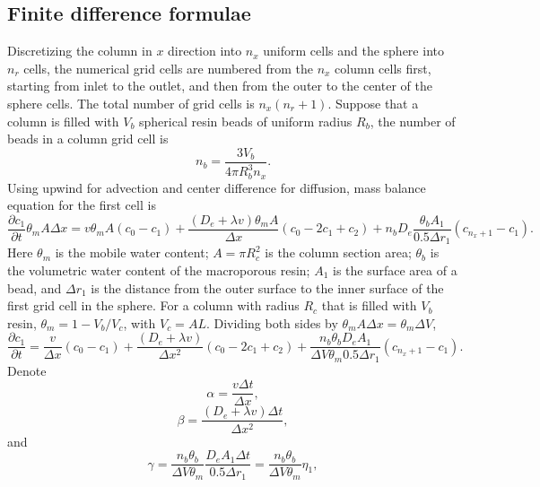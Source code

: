 \documentclass{article}
\begin{document}
\subsection{Finite difference formulae}
Discretizing the column in $x$ direction into $n_x$ uniform cells and the sphere into $n_r$  cells, the numerical grid cells are numbered from the $n_x$ column cells first, starting from inlet to the outlet, and then from the outer to the center of the sphere cells. The total number of grid cells is $n_x(n_r + 1)$. Suppose that a column is filled with $V_b$ spherical resin beads of uniform radius $R_b$, the number of beads in a column grid cell is
\begin{equation}
n_b = \frac{3V_b}{4\pi R_b^3n_x} .
\end{equation}
Using upwind for advection and center difference for diffusion, mass balance equation for the first cell is
\begin{equation}
\frac{\partial c_1}{\partial t}\theta_m A \Delta x = v\theta_m A(c_0 - c_1) + \frac{(D_e+\lambda v )\theta_m A}{\Delta x} \left(c_0 -2 c_1 + c_2\right) + n_b D_e \frac{\theta_bA_1}{0.5\Delta r_1} (c_{n_x+1} - c_1).
\end{equation}
Here $\theta_m$ is the mobile water content; $A=\pi R_c^2$ is the column section area; $\theta_b$  is the volumetric water content of the macroporous resin; $A_1$ is the surface area of a bead, and $\Delta r_1$ is the distance from the outer surface to the inner surface of the first grid cell in the sphere. For a column with radius $R_c$ that is filled with $V_b$ resin, $\theta_m = 1 - V_b/V_c$, with $V_c = AL$. Dividing both sides by $\theta_mA\Delta x = \theta_m \Delta V$, 
\begin{equation}
\frac{\partial c_1}{\partial t}= \frac{v}{\Delta x}(c_0 - c_1) + \frac{(D_e+\lambda v )}{\Delta x^2} \left(c_0 -2 c_1 + c_2\right) + \frac{n_b \theta_b D_e A_1}{\Delta V \theta_m 0.5\Delta r_1} (c_{n_x+1} - c_1).
\end{equation}
Denote 
\begin{equation}
\alpha = \frac{v \Delta t}{\Delta x},
\end{equation}
\begin{equation}
\beta = \frac{(D_e + \lambda v) \Delta t}{\Delta x^2}, 
\end{equation}
and
\begin{equation}
\gamma = \frac{n_b\theta_b}{\Delta V \theta_m}\frac{D_eA_1\Delta t}{0.5\Delta r_1} =  \frac{n_b\theta_b}{\Delta V \theta_m}\eta_1,
\end{equation}
\end{document}
